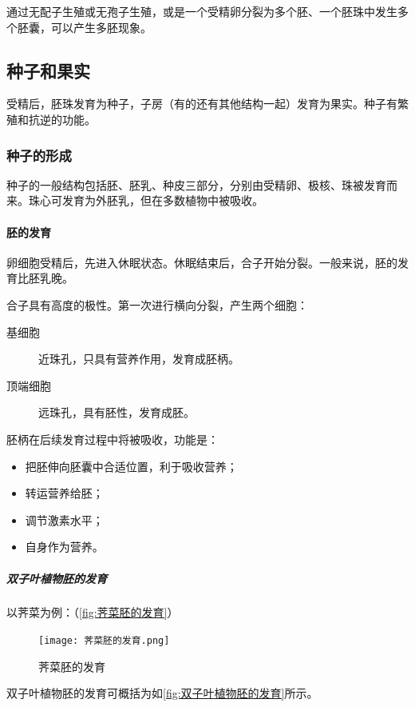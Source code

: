 通过无配子生殖或无孢子生殖，或是一个受精卵分裂为多个胚、一个胚珠中发生多个胚囊，可以产生多胚现象。

\subsection{种子和果实}

受精后，胚珠发育为种子，子房（有的还有其他结构一起）发育为果实。种子有繁殖和抗逆的功能。

\subsubsection{种子的形成}

种子的一般结构包括胚、胚乳、种皮三部分，分别由受精卵、极核、珠被发育而来。珠心可发育为外胚乳，但在多数植物中被吸收。

\paragraph{胚的发育}

卵细胞受精后，先进入休眠状态。休眠结束后，合子开始分裂。一般来说，胚的发育比胚乳晚。

合子具有高度的极性。第一次进行横向分裂，产生两个细胞：

\begin{description}
	\item[基细胞] 近珠孔，只具有营养作用，发育成胚柄。
	\item[顶端细胞] 远珠孔，具有胚性，发育成胚。
\end{description}

胚柄在后续发育过程中将被吸收，功能是：

\begin{itemize}
	\item 把胚伸向胚囊中合适位置，利于吸收营养；
	\item 转运营养给胚；
	\item 调节激素水平；
	\item 自身作为营养。
\end{itemize}

\subparagraph{双子叶植物胚的发育}

以荠菜为例：（\autoref{fig:荠菜胚的发育}）

\begin{figure}[htbp]
	\centering
	\texttt{[image: 荠菜胚的发育.png]}
	\caption{荠菜胚的发育}
	\label{fig:荠菜胚的发育}
\end{figure}

双子叶植物胚的发育可概括为如\autoref{fig:双子叶植物胚的发育}所示。

